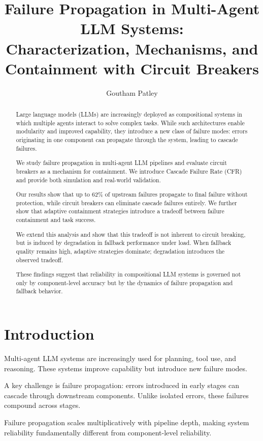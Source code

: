 \documentclass[11pt]{article}
\title{Failure Propagation in Multi-Agent LLM Systems:\\
Characterization, Mechanisms, and Containment with Circuit Breakers}
\author{Goutham Patley}
\date{}
\begin{document}
\maketitle

\begin{abstract}
Large language models (LLMs) are increasingly deployed as compositional systems in which multiple agents interact to solve complex tasks. While such architectures enable modularity and improved capability, they introduce a new class of failure modes: errors originating in one component can propagate through the system, leading to cascade failures.

We study failure propagation in multi-agent LLM pipelines and evaluate circuit breakers as a mechanism for containment. We introduce Cascade Failure Rate (CFR) and provide both simulation and real-world validation.

Our results show that up to 62\% of upstream failures propagate to final failure without protection, while circuit breakers can eliminate cascade failures entirely. We further show that adaptive containment strategies introduce a tradeoff between failure containment and task success.

We extend this analysis and show that this tradeoff is not inherent to circuit breaking, but is induced by degradation in fallback performance under load. When fallback quality remains high, adaptive strategies dominate; degradation introduces the observed tradeoff.

These findings suggest that reliability in compositional LLM systems is governed not only by component-level accuracy but by the dynamics of failure propagation and fallback behavior.
\end{abstract}

\section{Introduction}

Multi-agent LLM systems are increasingly used for planning, tool use, and reasoning. These systems improve capability but introduce new failure modes.

A key challenge is failure propagation: errors introduced in early stages can cascade through downstream components. Unlike isolated errors, these failures compound across stages.

Failure propagation scales multiplicatively with pipeline depth, making system reliability fundamentally different from component-level reliability.
\end{document}
